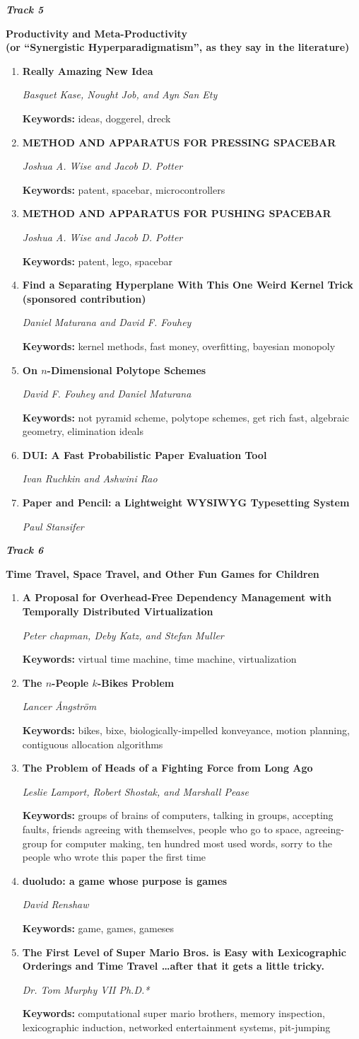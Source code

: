 \documentclass[letter]{article}
\newcommand\track[2]{\begin{center} {\Large \bf \em \sc Track #1} \vspace{0.2in}

{\huge \bf #2} \vspace{0.15in}
\end{center}
\thispagestyle{empty}}
\newcommand\asdf[2]{\vspace{0.15in} \item {\Large \bf \sf #1}

{\large \em #2}}
\newcommand\keywords[1]{

{\small {\bf Keywords:} #1}}
\newcommand\intermission[2]{}
\begin{document}
\newpage

\track{5}{Productivity and Meta-Productivity \\ \large (or ``Synergistic Hyperparadigmatism'', as they say in the literature)}
\begin{enumerate}
\asdf{Really Amazing New Idea}
{Basquet Kase, Nought Job, and Ayn San Ety}
\keywords{ideas, doggerel, dreck}
\asdf{METHOD AND APPARATUS FOR PRESSING SPACEBAR}
{Joshua A. Wise and Jacob D. Potter}
\keywords{patent, spacebar, microcontrollers}
\asdf{METHOD AND APPARATUS FOR PUSHING SPACEBAR}
{Joshua A. Wise and Jacob D. Potter}
\keywords{patent, lego, spacebar}
\asdf{Find a Separating Hyperplane With This One Weird Kernel Trick \\(sponsored contribution)}
{Daniel Maturana and David F. Fouhey}
\keywords{kernel methods, fast money, overfitting, bayesian monopoly}
\asdf{On $n$-Dimensional Polytope Schemes}
{David F. Fouhey and Daniel Maturana}
\keywords{not pyramid scheme, polytope schemes, get rich fast, algebraic geometry, elimination ideals}
\asdf{DUI: A Fast Probabilistic Paper Evaluation Tool}
{Ivan Ruchkin and Ashwini Rao}
\asdf{Paper and Pencil: a Lightweight WYSIWYG Typesetting System}
{Paul Stansifer}
\end{enumerate}
\intermission{proti-p}{joke, got, old}

\newpage


\track{6}{Time Travel, Space Travel, and Other Fun Games for Children}
\begin{enumerate}
\asdf{A Proposal for Overhead-Free Dependency Management with Temporally Distributed Virtualization}
{Peter chapman, Deby Katz, and Stefan Muller}
\keywords{virtual time machine, time machine, virtualization}
\asdf{The $n$-People $k$-Bikes Problem}
{Lancer \r{A}ngstr\"{o}m}
\keywords{bikes, bixe, biologically-impelled konveyance, motion planning, contiguous allocation algorithms}
\asdf{The Problem of Heads of a Fighting Force from Long Ago}
{Leslie Lamport, Robert Shostak, and Marshall Pease}
\keywords{groups of brains of computers, talking in groups, accepting faults, friends agreeing with themselves, people who go to space, agreeing-group for computer making, ten hundred most used words, sorry to the people who wrote this paper the first time}
\asdf{duoludo: a game whose purpose is games}
{David Renshaw}
\keywords{game, games, gameses}
\asdf{The First Level of Super Mario Bros. is Easy with Lexicographic Orderings and Time Travel {\normalsize\dots after that it gets a little tricky.}}
{Dr. Tom Murphy VII Ph.D.*}
\keywords{computational super mario brothers, memory inspection, lexicographic induction, networked entertainment systems, pit-jumping}
\end{enumerate}
\end{document}
